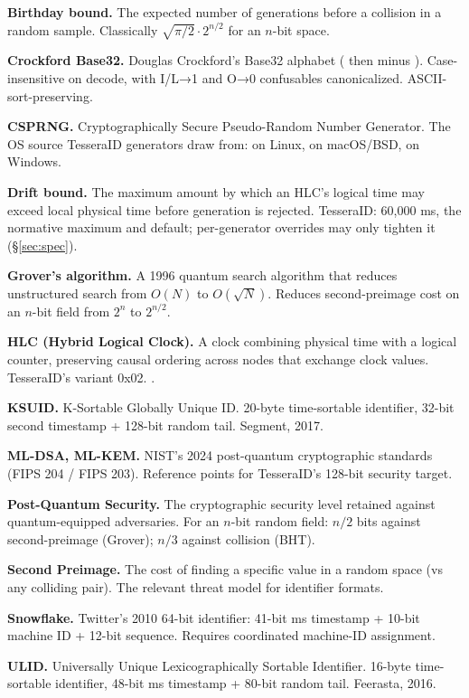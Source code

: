 \textbf{Birthday bound.} The expected number of generations before a collision in a random sample. Classically $\sqrt{\pi/2} \cdot 2^{n/2}$ for an $n$-bit space.

\textbf{Crockford Base32.} Douglas Crockford's Base32 alphabet ( then  minus ). Case-insensitive on decode, with I/L→1 and O→0 confusables canonicalized. ASCII-sort-preserving.

\textbf{CSPRNG.} Cryptographically Secure Pseudo-Random Number Generator. The OS source TesseraID generators draw from:  on Linux,  on macOS/BSD,  on Windows.

\textbf{Drift bound.} The maximum amount by which an HLC's logical time may exceed local physical time before generation is rejected. TesseraID: 60{,}000 ms, the normative maximum and default; per-generator overrides may only tighten it (§\ref{sec:spec}).

\textbf{Grover's algorithm.} A 1996 quantum search algorithm that reduces unstructured search from $O(N)$ to $O(\sqrt{N})$. Reduces second-preimage cost on an $n$-bit field from $2^n$ to $2^{n/2}$.

\textbf{HLC (Hybrid Logical Clock).} A clock combining physical time with a logical counter, preserving causal ordering across nodes that exchange clock values. TesseraID's variant 0x02. \citet{kulkarni2014hlc}.

\textbf{KSUID.} K-Sortable Globally Unique ID. 20-byte time-sortable identifier, 32-bit second timestamp + 128-bit random tail. Segment, 2017.

\textbf{ML-DSA, ML-KEM.} NIST's 2024 post-quantum cryptographic standards (FIPS 204 / FIPS 203). Reference points for TesseraID's 128-bit security target.

\textbf{Post-Quantum Security.} The cryptographic security level retained against quantum-equipped adversaries. For an $n$-bit random field: $n/2$ bits against second-preimage (Grover); $n/3$ against collision (BHT).

\textbf{Second Preimage.} The cost of finding a specific value in a random space (vs any colliding pair). The relevant threat model for identifier formats.

\textbf{Snowflake.} Twitter's 2010 64-bit identifier: 41-bit ms timestamp + 10-bit machine ID + 12-bit sequence. Requires coordinated machine-ID assignment.

\textbf{ULID.} Universally Unique Lexicographically Sortable Identifier. 16-byte time-sortable identifier, 48-bit ms timestamp + 80-bit random tail. Feerasta, 2016.

